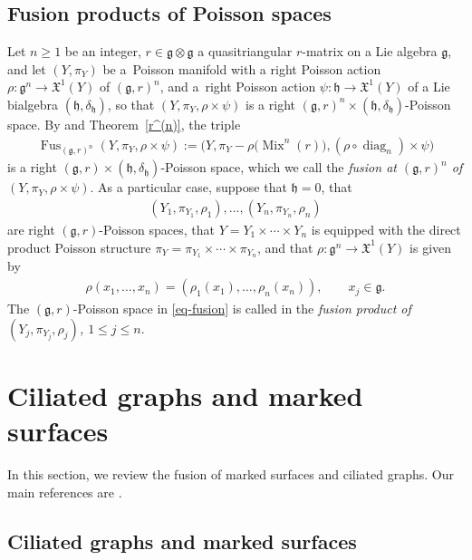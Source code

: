 \documentclass[10pt,a4paper]{amsart}
\numberwithin{equation}{section}
\newcommand{\XX}{\mathfrak{X}}
\def \g {\mathfrak{a}}
\def \g {\mathfrak{g}}
\def \h {\mathfrak{h}}
\DeclareMathOperator{\diag}{diag}
\DeclareMathOperator{\Mix}{Mix}
\DeclareMathOperator{\Fus}{Fus}
\def \sY {{\scriptscriptstyle Y}}
\newcommand{\piY}{{\pi_{\scriptscriptstyle Y}}}
\begin{document}
\subsection{Fusion products of Poisson spaces} \label{subsec-fusion}

Let $n \geq 1$ be an integer, $r \in \g \otimes \g$ a quasitriangular $r$-matrix on a Lie algebra $\g$, and let $(Y, \piY)$ be a~Poisson manifold with a right Poisson action $\rho\colon \g^n \to \XX^1(Y)$ of $(\g, r)^n$, and a~right Poisson action $\psi\colon \h \to \XX^1(Y)$ of a Lie bialgebra $(\h, \delta_\h)$, so that $(Y, \piY, \rho \times \psi)$ is a right $(\g, r)^n \times (\h, \delta_\h)$-Poisson space. By \cite[Lemma~2.16]{Lu-Mou:mixed} and Theorem~\ref{r^(n)}, the triple
\begin{gather}
\Fus_{(\g, r)^n}(Y, \piY, \rho \times \psi) := \big(Y, \piY - \rho\big(\Mix^n(r)\big), (\rho \circ \diag_n) \times \psi \big) \label{eq-fusion}
\end{gather}
is a right $(\g, r) \times (\h, \delta_\h)$-Poisson space, which we call the {\it fusion at $(\g, r)^n$ of $(Y, \piY, \rho \times \psi)$}. As a particular case, suppose that $\h=0$, that
\begin{gather*}
(Y_1, \pi_{\sY_1}, \rho_1), \ldots, (Y_n, \pi_{\sY_n}, \rho_n)
\end{gather*}
are right $(\g, r)$-Poisson spaces, that $Y = Y_1 \times \cdots \times Y_n$ is equipped with the direct product Poisson structure $\piY = \pi_{\sY_1} \times \cdots \times \pi_{\sY_n}$, and that $\rho\colon \g^n \to \XX^1(Y)$ is given by
\begin{gather*}
\rho(x_1, \ldots, x_n) = (\rho_1(x_1), \ldots, \rho_n(x_n)), \qquad x_j \in \g.
\end{gather*}
The $(\g, r)$-Poisson space in \eqref{eq-fusion} is called in \cite{Lu-Mou:mixed} the {\it fusion product of $(Y_j, \pi_{\sY_j}, \rho_j)$, $1 \leq j \leq n$}.

\section{Ciliated graphs and marked surfaces} \label{sec-graphs&surfaces}

In this section, we review the fusion of marked surfaces and ciliated graphs. Our main references are \cite{FR1, LBS1}.

\subsection{Ciliated graphs and marked surfaces} \label{subsec-ciliated}
\end{document}
